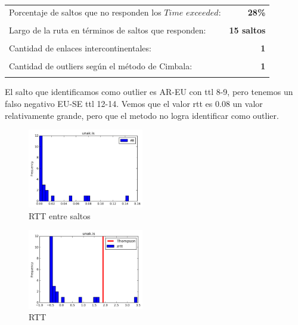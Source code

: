 \begin{center}
\begin{tabular}{p{6.5cm}r}
Porcentaje de saltos que no responden los $Time$ $exceeded$: & \textbf{28\%} \\ \\ 
Largo de la ruta en términos de saltos que responden: &\textbf{15 saltos} \\ \\
Cantidad de enlaces intercontinentales: & \textbf{1} \\ \\
Cantidad de outliers según el método de Cimbala: & \textbf{1} \\ \\
\end{tabular}
\end{center}

El salto que identificamos como outlier es AR-EU con ttl 8-9, pero tenemos un falso negativo EU-SE ttl 12-14. Vemos que el valor rtt es $0.08$ un valor relativamente grande, pero que el metodo no logra identificar como outlier.


\begin{figure}[H]
  \centering
    \includegraphics[width=0.45\textwidth]{histogramas_rtt/unak-is.png}
  \caption{RTT entre saltos}
  \label{entropia-s}
\end{figure}

\begin{center}
\end{center}

\begin{figure}[H]
  \centering
    \includegraphics[width=0.45\textwidth]{histogramas_thompson/unak-is.png}
  \caption{RTT }
  \label{entropia-s}
\end{figure}

